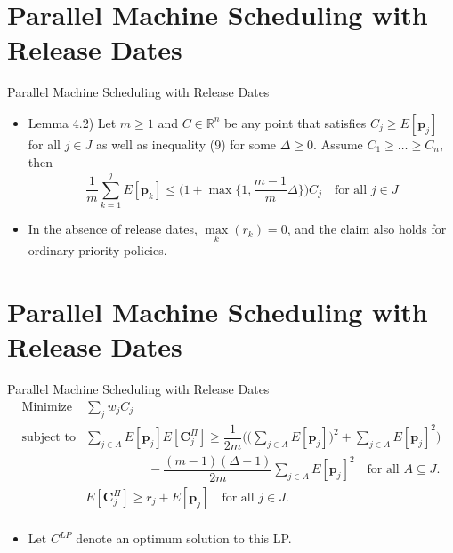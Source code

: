 \documentclass{beamer}
\begin{document}
\section{Parallel Machine Scheduling with Release Dates}
\begin{frame}{Parallel Machine Scheduling with Release Dates}
    \begin{itemize}
        \justifying
        \item Lemma 4.2) Let $m \geq 1$ and $C\in \mathbb{R}^n$ be any point that satisfies $C_j \geq E[\pmb{p}_j]$ for all $j\in J$ as well as inequality (9) for some $\Delta \geq 0$. Assume $C_1\geq\dots\geq C_n$, then
        \vspace{0.6cm}
        \begin{equation}
        \frac{1}{m}\sum\limits_{k=1}^{j}E[\pmb{p}_k]\leq
        \Bigg( 1+\max \Bigg\{ 1,\frac{m-1}{m} \Delta \Bigg\} \Bigg) C_j \quad \text{for all }j\in J
        \end{equation}
        \vspace{0.6cm}
        \item In the absence of release dates, $\max\limits_k (r_k)=0$, and the claim also holds for ordinary priority policies.
    \end{itemize}
\end{frame}

\section{Parallel Machine Scheduling with Release Dates}
\begin{frame}{Parallel Machine Scheduling with Release Dates}
		\begin{equation*}
		\begin{array}{lll}
			\text{Minimize}& \sum\limits_{j} w_{j}C_j\\[8pt]
            \text{subject to}
            &\sum\limits_{j\in A}E[\pmb{p}_j]E[\pmb{C}_j^\Pi] 
            \geq \dfrac{1}{2m} \Bigg(\Bigg(  \sum\limits_{j\in A}E[\pmb{p}_j]\Bigg)^2 + \sum\limits_{j\in A}E[\pmb{p}_j]^2 \Bigg)\\[20pt]
            & \qquad\qquad\quad - \dfrac{(m-1)(\Delta-1)}{2m}\sum\limits_{j\in A}E[\pmb{p}_j]^2
            \quad \text{for all } A \subseteq J. \\[30pt]
			& E[\pmb{C}_j^{\Pi}]\geq r_j+E[\pmb{p}_j] \quad \text{for all } j \in J.\\[8pt]
		\end{array}
		\end{equation*}
    \begin{itemize}
        \justifying
        \vspace{0.4cm}
        \item Let $C^{LP}$ denote an optimum solution to this LP.
    \end{itemize}        
\end{frame}
\end{document}
